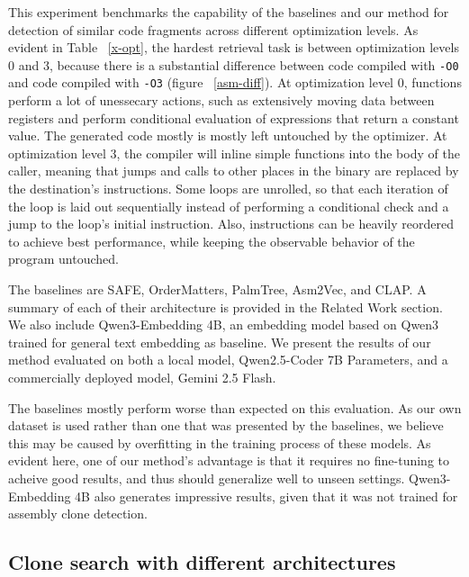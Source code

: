 \documentclass[conference,compsoc]{IEEEtran}
\begin{document}
This experiment benchmarks the capability of the baselines and our method for detection of similar code fragments across
different optimization levels. As evident in Table ~\ref{x-opt}, the hardest retrieval task is between optimization levels 0 and 3,
because there is a substantial difference between code compiled with \texttt{-O0} and code compiled with \texttt{-O3}
(figure ~\ref{asm-diff}). At optimization level 0, functions perform a lot of unessecary actions, such as extensively moving
data between registers and perform conditional evaluation of expressions that return a constant value. The generated code
mostly is mostly left untouched by the optimizer. At optimization level 3, the compiler will inline simple functions into the
body of the caller, meaning that jumps and calls to other places in the binary are replaced by the destination's instructions.
Some loops are unrolled, so that each iteration of the loop is laid out sequentially instead of performing a conditional check
and a jump to the loop's initial instruction. Also, instructions can be heavily reordered to achieve best performance, while
keeping the observable behavior of the program untouched.

The baselines are SAFE, OrderMatters, PalmTree, Asm2Vec, and CLAP. A summary of each of their architecture is provided in the Related
Work section. We also include Qwen3-Embedding 4B, an embedding model based on Qwen3 trained for general text embedding as baseline.
We present the results of our method evaluated on both a local model, Qwen2.5-Coder 7B Parameters, and a commercially deployed model,
Gemini 2.5 Flash.

The baselines mostly perform worse than expected on this evaluation. As our own dataset is used
rather than one that was presented by the baselines, we believe this may be caused by overfitting in the training process of these models.
As evident here, one of our method's advantage is that it requires no fine-tuning to acheive good results, and thus should generalize
well to unseen settings. Qwen3-Embedding 4B also generates impressive results, given that it was not trained for assembly clone detection.

\subsection{Clone search with different architectures}
\end{document}
